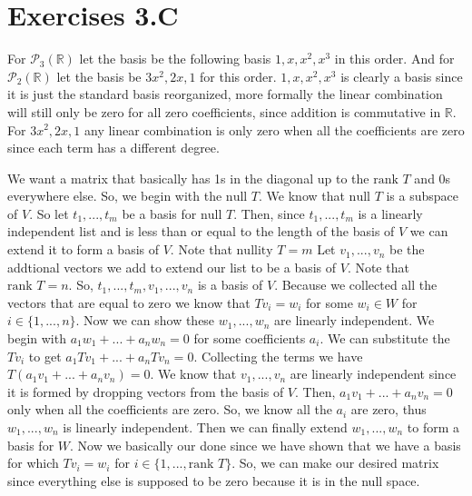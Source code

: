 \documentclass[10pt, twocolumn]{article}
\newcommand{\R}{\mathbb{R}}
\newcommand{\poly}[2]{\mathcal{P}_{#1}\left(#2\right)}
\newcommand{\nul}{\text{null }}
\newcommand{\nullity}{\text{nullity }}
\newcommand{\rank}{\text{rank }}
\begin{document}
\begin{q}[26]
    
\end{q}

\section{Exercises 3.C}
\begin{q}[2]
    For $ \poly{3}{\R} $ let the basis be the following basis $ 1, x, x^2, x^3 $ in this order. 
    And for $ \poly{2}{\R} $ let the basis be $ 3x^2, 2x, 1 $ for this order. 
    $ 1, x, x^2, x^3 $ is clearly a basis since it is just the standard basis reorganized, more formally the linear combination will still only be zero for all zero coefficients, since addition is commutative in $ \R $. 
    For  $ 3x^2, 2x, 1 $ any linear combination is only zero when all the coefficients are zero since each term has a different degree. 
\end{q}
\begin{q}[3]
    We want a matrix that basically has 1s in the diagonal up to the $ \rank T $ and 0s everywhere else. 
    So, we begin with the $ \nul T $. 
    We know that $ \nul T $ is a subspace of $ V $. 
    So let $ t_1, ..., t_m $ be a basis for $ \nul T $. 
    Then, since $ t_1, ..., t_m $ is a linearly independent list and is less than or equal to the length of the basis of $ V $ we can extend it to form a basis of $ V $.
    Note that $ \nullity T = m $
    Let $ v_1, ..., v_n $ be the addtional vectors we add to extend our list to be a basis of $ V $. 
    Note that $ \rank T = n $. 
    So, $ t_1, ..., t_m , v_1, ..., v_n $ is a basis of $ V $. 
    Because we collected all the vectors that are equal to zero we know that $ Tv_i = w_i $ for some $ w_i \in W $ for $ i \in \{1, ..., n\} $. 
    Now we can show these $ w_1, ..., w_n $ are linearly independent. 
    We begin with $ a_1w_1 + ... + a_n w_n = 0 $ for some coefficients $ a_i $. 
    We can substitute the $ Tv_i $ to get $ a_1Tv_1 + ... + a_n Tv_n = 0 $. 
    Collecting the terms we have $ T(a_1v_1 + ... + a_n v_n) = 0 $. 
    We know that $ v_1, ..., v_n $ are linearly independent since it is formed by dropping vectors from the basis of $ V $. 
    Then, $ a_1 v_1 + ... + a_n v_n = 0 $ only when all the coefficients are zero.
    So, we know all the $ a_i $ are zero, thus $ w_1, ..., w_n $ is linearly independent. 
    Then we can finally extend $ w_1, ..., w_n $ to form a basis for $ W $. 
    Now we basically our done since we have shown that we have a basis for which $ Tv_i = w_i $ for $ i \in \{1, ..., \rank T\} $. 
    So, we can make our desired matrix since everything else is supposed to be zero because it is in the null space. 
\end{q}
\end{document}
